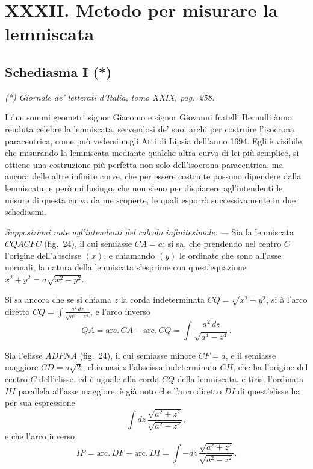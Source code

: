 \documentclass{article}
\begin{document}
\section*{XXXII. Metodo per misurare la lemniscata}
\subsection*{Schediasma I (*)}
\emph{(*) Giornale de' letterati d'Italia, tomo XXIX, pag.~258.}

I due sommi geometri signor Giacomo e signor Giovanni fratelli Bernulli ànno renduta
celebre la lemniscata, servendosi de' suoi archi per costruire l'isocrona paracentrica,
come può vedersi negli Atti di Lipsia dell'anno 1694. Egli è visibile, che misurando la
lemniscata mediante qualche altra curva di lei più semplice, si ottiene una costruzione
più perfetta non solo dell'isocrona paracentrica, ma ancora delle altre infinite curve,
che per essere costruite possono dipendere dalla lemniscata; e però mi lusingo, che non
sieno per dispiacere agl'intendenti le misure di questa curva da me scoperte, le quali
esporrò successivamente in due schediasmi.

\emph{Supposizioni note agl'intendenti del calcolo infinitesimale.} --- Sia la lemniscata
$CQACFC$ (fig.~24), il cui semiasse $CA = a$; si sa, che prendendo nel centro $C$ l'origine
dell'abscisse $(x)$, e chiamando $(y)$ le ordinate che sono all'asse normali, la natura
della lemniscata s'esprime con quest'equazione $x^{2} + y^{2} = a\sqrt{x^{2} - y^{2}}$.

Si sa ancora che se si chiama $z$ la corda indeterminata $CQ = \sqrt{x^{2} + y^{2}}$, si à
l'arco diretto $CQ = \displaystyle\int \frac{a^{2}\,dz}{\sqrt{a^{4} - z^{4}}}$, e l'arco inverso
\[ QA = \mathrm{arc.}\,CA - \mathrm{arc.}\,CQ = \int \frac{a^{2}\,dz}{\sqrt{a^{4} - z^{4}}}. \]

Sia l'elisse $ADFNA$ (fig.~24), il cui semiasse minore $CF = a$, e il semiasse maggiore
$CD = a\sqrt{2}$; chiamasi $z$ l'abscissa indeterminata $CH$, che ha l'origine del centro
$C$ dell'elisse, ed è uguale alla corda $CQ$ della lemniscata, e tirisi l'ordinata $HI$
parallela all'asse maggiore; è già noto che l'arco diretto $DI$ di quest'elisse ha per sua
espressione
\[ \int dz\, \frac{\sqrt{a^{2} + z^{2}}}{\sqrt{a^{2} - z^{2}}}, \]
e che l'arco inverso
\[ IF = \mathrm{arc.}\,DF - \mathrm{arc.}\,DI = \int -dz\, \frac{\sqrt{a^{2} + z^{2}}}{\sqrt{a^{2} - z^{2}}}. \]

\end{document}
